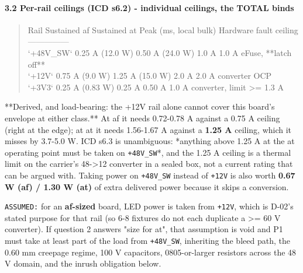 \documentclass[11pt,a4paper]{article}
\begin{document}
\paragraph*{3.2 Per-rail ceilings (ICD s6.2) - individual ceilings, the TOTAL binds}
\begin{quote}\small\ttfamily\raggedright
\textbar{} Rail \textbar{} Sustained af \textbar{} Sustained at \textbar{} Peak (ms, local bulk) \textbar{} Hardware fault ceiling \textbar{}\\
\textbar{}---\textbar{}---\textbar{}---\textbar{}---\textbar{}---\textbar{}\\
\textbar{} `+48V\_SW` \textbar{} 0.25 A (12.0 W) \textbar{} 0.50 A (24.0 W) \textbar{} 1.0 A \textbar{} 1.0 A eFuse, {*}{*}latch off{*}{*} \textbar{}\\
\textbar{} `+12V` \textbar{} 0.75 A (9.0 W) \textbar{} 1.25 A (15.0 W) \textbar{} 2.0 A \textbar{} 2.0 A converter OCP \textbar{}\\
\textbar{} `+3V3` \textbar{} 0.25 A (0.83 W) \textbar{} 0.25 A \textbar{} 0.50 A \textbar{} 1.0 A converter, limit \textgreater{}= 1.3 A \textbar{}
\end{quote}
{*}{*}Derived, and load-bearing: the +12V rail alone cannot cover this board's envelope at either class.{*}{*} At af it needs 0.72-0.78 A against a 0.75 A ceiling (right at the edge); at at it needs 1.56-1.67 A against a \textbf{1.25 A} ceiling, which it misses by 3.7-5.0 W. ICD s6.3 is unambiguous: {*}anything above 1.25 A at the at operating point must be taken on \texttt{+48V\_SW}{*}, and the 1.25 A ceiling is a thermal limit on the carrier's 48-\textgreater{}12 converter in a sealed box, not a current rating that can be argued with. Taking power on \texttt{+48V\_SW} instead of \texttt{+12V} is also worth \textbf{0.67 W (af) / 1.30 W (at)} of extra delivered power because it skips a conversion.

\texttt{ASSUMED:} for an \textbf{af-sized} board, LED power is taken from \texttt{+12V}, which is D-02's stated purpose for that rail (so 6-8 fixtures do not each duplicate a \textgreater{}= 60 V converter). If question 2 answers "size for at", that assumption is void and P1 must take at least part of the load from \texttt{+48V\_SW}, inheriting the bleed path, the 0.60 mm creepage regime, 100 V capacitors, 0805-or-larger resistors across the 48 V domain, and the inrush obligation below.
\end{document}
